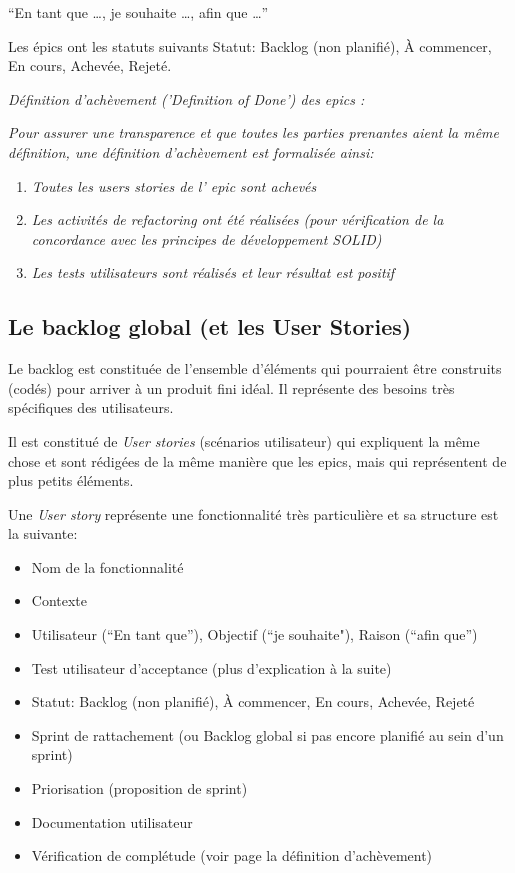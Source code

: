 “En tant que …, je souhaite …, afin que …” 

Les épics ont les statuts suivants Statut: Backlog (non planifié), À commencer, En cours, Achevée, Rejeté.\\



\noindent%
\hfill%
\begin{minipage}{12cm}
      \textsl{Définition d'achèvement ('Definition of Done') des epics :}

      \textsl{Pour assurer une transparence et que toutes les parties prenantes aient la même définition, 
une définition d'achèvement est formalisée ainsi:}
\begin{enumerate}     
      \item  \textsl{Toutes les users stories de l' epic sont achevés}
      \item  \textsl{Les activités de refactoring ont été réalisées (pour vérification de la concordance 
      avec les principes de développement SOLID)}
      \item  \textsl{Les tests utilisateurs sont réalisés et leur résultat est positif}
\end{enumerate}
\end{minipage}

\subsection{Le backlog global (et les User Stories)}

Le backlog est constituée de l’ensemble d'éléments qui pourraient être construits (codés) pour arriver 
à un produit fini idéal. Il représente des besoins très spécifiques des utilisateurs. 

Il est constitué de \emph{User stories} (scénarios utilisateur) qui expliquent la même chose et 
sont rédigées de la même manière que les epics, mais qui représentent de plus petits éléments.

Une \emph{User story} représente une fonctionnalité très particulière et sa structure est la suivante:

\begin{itemize}
      \item Nom de la fonctionnalité
      \item Contexte
      \item Utilisateur (“En tant que”), Objectif (“je souhaite"), Raison (“afin que”)
      \item Test utilisateur d’acceptance (plus d’explication à la suite)
      \item Statut: Backlog (non planifié), À commencer, En cours, Achevée, Rejeté
      \item Sprint de rattachement (ou Backlog global si pas encore planifié au sein d’un sprint)
      \item Priorisation (proposition de sprint)
      \item Documentation utilisateur
      \item Vérification de complétude (voir page \pageref{DefofDoneUS} la définition d'achèvement)
\end{itemize}

